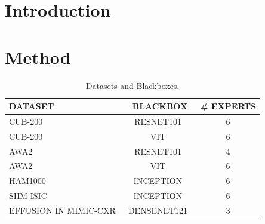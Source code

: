 \documentclass{article}
\theoremstyle{plain}
\theoremstyle{definition}
\theoremstyle{remark}
\begin{document}
\begin{abstract}

\end{abstract}


\section{Introduction}
% 


% 


\section{Method}
\label{sec:method}
% 


\begin{table}[t]
\caption{Datasets and Blackboxes.}
\fontsize{5.2pt}{0.30cm}\selectfont
\label{tab:dataset}
\vskip 0.1in
\begin{center}
\begin{tabular}{lcc}
\toprule
DATASET & BLACKBOX & \# EXPERTS  \\
\midrule
CUB-200~\cite{wah2011caltech}  & RESNET101~\cite{he2016deep}& 6 \\
CUB-200~\cite{wah2011caltech}  & VIT~\cite{wang2021feature}&  6 \\
AWA2~\cite{xian2018zero} & RESNET101~\cite{he2016deep} & 4\\
AWA2~\cite{xian2018zero} & VIT~\cite{wang2021feature} & 6\\
HAM1000~\cite{tschandl2018ham10000}    & INCEPTION~\cite{szegedy2015going}& 6\\
SIIM-ISIC~\cite{rotemberg2021patient}    & INCEPTION~\cite{szegedy2015going} & 6\\
EFFUSION IN MIMIC-CXR~\cite{12_johnsonmimic}    & DENSENET121~\cite{huang2017densely} & 3\\
\bottomrule
\end{tabular}
\end{center}
\vskip -0.1in
\end{table}
\end{document}

